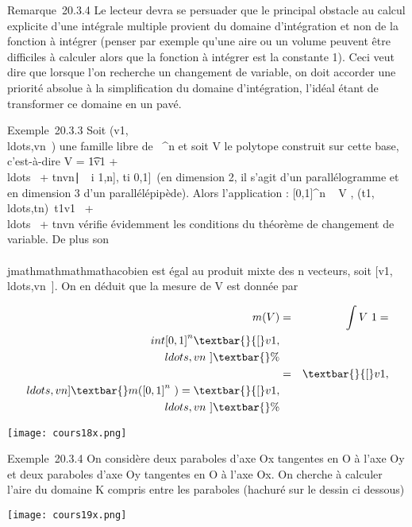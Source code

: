 Remarque~20.3.4 Le lecteur devra se persuader que le principal obstacle
au calcul explicite d'une intégrale multiple provient du domaine
d'intégration et non de la fonction à intégrer (penser par exemple
qu'une aire ou un volume peuvent être difficiles à calculer alors que la
fonction à intégrer est la constante 1). Ceci veut dire que lorsque l'on
recherche un changement de variable, on doit accorder une priorité
absolue à la simplification du domaine d'intégration, l'idéal étant de
transformer ce domaine en un pavé.

Exemple~20.3.3 Soit
(v1,\\ldots,vn~)
une famille libre de ~^n et soit V le polytope construit sur
cette base, c'est-à-dire V = \t1v1
+ \\ldots~ +
tnvn∣\forall~~i
\in {[}1,n{]}, ti \in {[}0,1{]}\ (en dimension 2,
il s'agit d'un parallélogramme et en dimension 3 d'un parallélépipède).
Alors l'application \phi : {[}0,1{]}^n \rightarrow~ V ,
(t1,\\ldots,tn)\mapsto~t1v1~
+ \\ldots~ +
tnvn vérifie évidemment les conditions du théorème
de changement de variable. De plus son \\\\jmathmathmathmathacobien est égal au produit
mixte des n vecteurs, soit
{[}v1,\\ldots,vn~{]}.
On en déduit que la mesure de V est donnée par

\begin{align*} m(V )& =&
\int  V ~1 =\\int

{[}0,1{]}^n\textbar{}{[}v1,\\ldots,vn~{]}\textbar{}
\%& \\ & =&
\textbar{}{[}v1,\\ldots,vn{]}\textbar{}m({[}0,1{]}^n~)
= \textbar{}{[}v
1,\\ldots,vn~{]}\textbar{}\%&
\\ \end{align*}

\texttt{[image: cours18x.png]}

Exemple~20.3.4 On considère deux paraboles d'axe Ox tangentes en O à
l'axe Oy et deux paraboles d'axe Oy tangentes en O à l'axe Ox. On
cherche à calculer l'aire du domaine K compris entre les paraboles
(hachuré sur le dessin ci dessous)

\texttt{[image: cours19x.png]}

